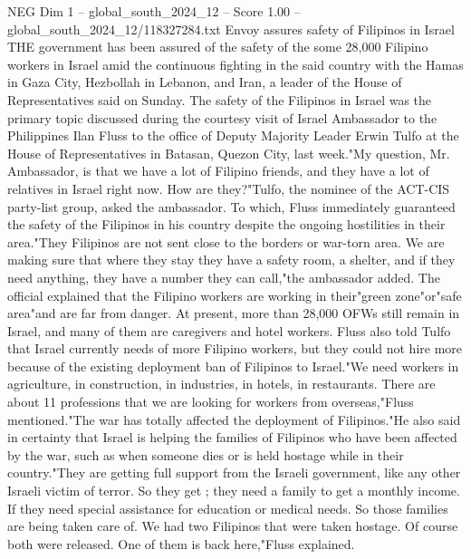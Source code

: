 \begin{textsample}{NEG Dim 1 – global\_south\_2024\_12 – Score 1.00 – global\_south\_2024\_12/118327284.txt}  \label{ex:f1_neg_258}
Envoy assures safety of Filipinos in Israel THE government has been assured of the safety of the some 28,000 Filipino workers in Israel amid the continuous fighting in the said country with the Hamas in Gaza City, Hezbollah in Lebanon, and Iran, a leader of the House of Representatives said on Sunday.
The safety of the Filipinos in Israel was the primary topic discussed during the courtesy visit of Israel Ambassador to the Philippines Ilan Fluss to the office of Deputy Majority Leader Erwin Tulfo at the House of Representatives in Batasan, Quezon City, last week."My question, Mr.
Ambassador, is that we have a lot of Filipino friends, and they have a lot of relatives in Israel right now.
How are they?"Tulfo, the nominee of the ACT-CIS party-list group, asked the ambassador.
To which, Fluss immediately guaranteed the safety of the Filipinos in his country despite the ongoing hostilities in their area."They Filipinos are not sent close to the borders or war-torn area.
We are making sure that where they stay they have a safety room, a shelter, and if they need anything, they have a number they can call,"the ambassador added.
The official explained that the Filipino workers are working in their"green zone"or"safe area"and are far from danger.
At present, more than 28,000 OFWs still remain in Israel, and many of them are caregivers and hotel workers.
Fluss also told Tulfo that Israel currently needs of more Filipino workers, but they could not hire more because of the existing deployment ban of Filipinos to Israel."We need workers in agriculture, in construction, in industries, in hotels, in restaurants.
There are about 11 professions that we are looking for workers from overseas,"Fluss mentioned."The war has totally affected the deployment of Filipinos."He also said in certainty that Israel is helping the families of Filipinos who have been affected by the war, such as when someone dies or is held hostage while in their country."They are getting full support from the Israeli government, like any other Israeli victim of terror.
So they get ; they need a family to get a monthly income.
If they need special assistance for education or medical needs.
So those families are being taken care of.
We had two Filipinos that were taken hostage.
Of course both were released.
One of them is back here,"Fluss explained.

\end{textsample}
